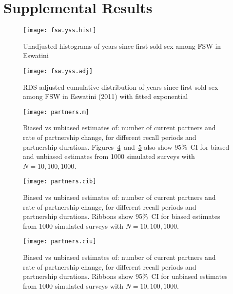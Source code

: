 \section{Supplemental Results}
\begin{figure}[h]
  \centering
  \texttt{[image: fsw.yss.hist]}
  \caption{Unadjusted histograms of
    years since first sold sex among FSW in Eswatini}
  \label{fig:fsw.yss.hist}
\end{figure}
\begin{figure}[h]
  \centering
  \texttt{[image: fsw.yss.adj]}
  \caption{RDS-adjusted cumulative distribution of
    years since first sold sex among FSW in Eswatini (2011)
    with fitted exponential}
  \label{fig:fsw.yss.adj}
\end{figure}
\newcommand{\pfigcap}{Biased vs unbiased estimates of:
  number of current partners and rate of partnership change,
  for different recall periods and partnership durations}
\newcommand{\pfigcapx}[2][Ribbons]{#1 show 95\%~CI for #2 estimates
  from 1000 simulated surveys with $N = 10, 100, 1000$.}
\begin{figure}[h]
  \texttt{[image: partners.m]}
  \caption{\pfigcap.
    \pfigcapx[Figures~\ref{fig:partners.cib}~and~\ref{fig:partners.ciu} also]{biased and unbiased}}
  \label{fig:partners.m}
\end{figure}
\begin{figure}[h]
  \texttt{[image: partners.cib]}
  \caption{\pfigcap. \pfigcapx{biased}}
  \label{fig:partners.cib}
\end{figure}
\begin{figure}[h]
  \texttt{[image: partners.ciu]}
  \caption{\pfigcap. \pfigcapx{unbiased}}
  \label{fig:partners.ciu}
\end{figure}
